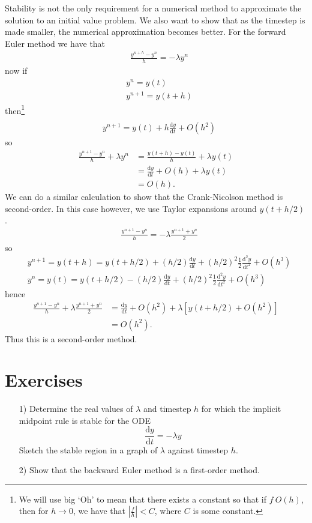 Stability is not the only requirement for a numerical method to approximate the solution to an initial value problem. We also want to show that as the timestep is made smaller, the numerical approximation becomes better. For the forward Euler method we have that
\begin{align*}
  &{} \frac{y^{n+h}-y^{n}}{h}=-\lambda y^n
\end{align*}
now if
\begin{align*}
&{}y^n=y(t) \\
&{}y^{n+1}=y(t+h)
\end{align*}
then\footnote{We will use big `Oh' to mean that there exists a constant so that if $f~O(h)$, then for $h\rightarrow0$, we have that $\left|\frac{f}{h}\right|<C$, where $C$ is some constant.}
\begin{align*}
\\&y^{n+1}= y(t)+h\frac{\mathrm{d}y}{\mathrm{d}t} + O(h^2)
\end{align*}
so
\begin{align*}
\frac{y^{n+1}-y^n}{h}+\lambda y^n &{} = \frac{y(t+h)-y(t)}{h} +\lambda y(t)
\\&{} =\frac{\mathrm{d}y}{\mathrm{d}t} +O(h)+\lambda y(t)
\\&{} = O(h).
\end{align*}
We can do a similar calculation to show that the Crank-Nicolson method is second-order. In this case however, we use Taylor expansions around $y(t+h/2)$.
\begin{align*}
&{}\frac{y^{n+1}-y^n}{h}=-\lambda \frac{ y^{n+1} + y^n}{2}
\end{align*}
so
\begin{align*}
&{} y^{n+1} =y(t+h)=y(t+h/2)+(h/2)\frac{\mathrm{d}y}{\mathrm{d}t} +(h/2)^2\frac{1}{2}\frac{\mathrm{d}^2y}{\mathrm{d}t^2} + O(h^3)
\\&{} y^{n} =y(t)=y(t+h/2)-(h/2)\frac{\mathrm{d}y}{\mathrm{d}t} +(h/2)^2\frac{1}{2}\frac{\mathrm{d}^2y}{\mathrm{d}t^2} + O(h^3)
\end{align*}
hence
\begin{align*}
\frac{y^{n+1}-y^n}{h}+\lambda \frac{ y^{n+1} + y^n}{2} &{} =\frac{\mathrm{d}y}{\mathrm{d}t} + O(h^2) +\lambda \left[y(t+h/2)+O(h^2) \right]
\\&{} = O(h^2).
\end{align*}
Thus this is a second-order method.

\section{Exercises}
\begin{enumerate}
\item[1)] Determine the real values of $\lambda$ and timestep $h$ for which the implicit midpoint rule is stable for the ODE 
\begin{equation*}
\frac{\mathrm{d}y}{\mathrm{d}t}=-\lambda y
\end{equation*}
Sketch the stable region in a graph of $\lambda$ against timestep $h$.
\item[2)] Show that the backward Euler method is a first-order method.
\end{enumerate}

